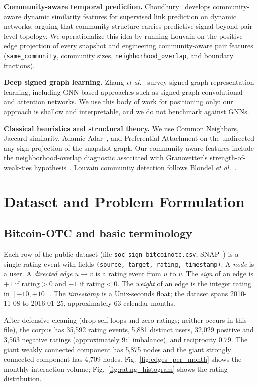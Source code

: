\documentclass[conference]{IEEEtran}
\newcommand{\code}[1]{\texttt{#1}}
\begin{document}
\textbf{Community-aware temporal prediction.}
Choudhury~\cite{choudhury2024} develops community-aware dynamic
similarity features for supervised link prediction on dynamic
networks, arguing that community structure carries predictive signal
beyond pair-level topology. We operationalize this idea by running
Louvain on the positive-edge projection of every snapshot and
engineering community-aware pair features
(\code{same\_community}, community sizes, \code{neighborhood\_overlap},
and boundary fractions).

\textbf{Deep signed graph learning.} Zhang \emph{et al.}~\cite{zhang2024}
survey signed graph representation learning, including
GNN-based approaches such as signed graph convolutional and attention
networks. We use this body of work for positioning only: our approach
is shallow and interpretable, and we do not benchmark against GNNs.

\textbf{Classical heuristics and structural theory.} We use Common
Neighbors, Jaccard similarity, Adamic-Adar~\cite{adamic2003}, and
Preferential Attachment on the undirected any-sign projection of the
snapshot graph. Our community-aware features include the
neighborhood-overlap diagnostic associated with Granovetter's
strength-of-weak-ties hypothesis~\cite{granovetter1973}. Louvain
community detection follows Blondel \emph{et al.}~\cite{blondel2008}.

\section{Dataset and Problem Formulation}

\subsection{Bitcoin-OTC and basic terminology}
Each row of the public dataset (file \code{soc-sign-bitcoinotc.csv},
SNAP~\cite{snap}) is a single rating event with fields
\code{(source, target, rating, timestamp)}. A \emph{node} is a user.
A \emph{directed edge} $u \to v$ is a rating event from $u$ to $v$. The
\emph{sign} of an edge is $+1$ if $\text{rating} > 0$ and $-1$ if
$\text{rating} < 0$. The \emph{weight} of an edge is the integer
rating in $[-10, +10]$. The \emph{timestamp} is a Unix-seconds float;
the dataset spans 2010-11-08 to 2016-01-25, approximately 63 calendar
months.

After defensive cleaning (drop self-loops and zero ratings; neither
occurs in this file), the corpus has 35{,}592 rating events, 5{,}881
distinct users, 32{,}029 positive and 3{,}563 negative ratings
(approximately 9:1 imbalance), and reciprocity $0.79$. The giant
weakly connected component has 5{,}875 nodes and the giant strongly
connected component has 4{,}709 nodes. Fig.~\ref{fig:edges_per_month}
shows the monthly interaction volume; Fig.~\ref{fig:rating_histogram}
shows the rating distribution.
\end{document}
